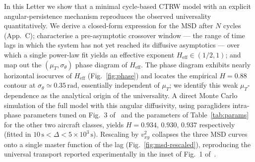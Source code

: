 \documentclass[11pt,a4paper]{article}
\begin{document}
In this Letter we show that a minimal cycle-based CTRW model with an
explicit angular-persistence mechanism reproduces the observed
universality quantitatively. We derive a closed-form expression for
the MSD after $N$ cycles (App.~C); characterise a pre-asymptotic
crossover window --- the range of time lags in which the system has
not yet reached its diffusive asymptotics --- over which a single
power-law fit yields an effective exponent $H_{\mathrm{eff}} \in
(1/2, 1)$; and map out the $(\mu_T,\sigma_\theta)$ phase diagram of
$H_{\mathrm{eff}}$. The phase diagram exhibits nearly horizontal
isocurves of $H_{\mathrm{eff}}$ (Fig.~\ref{fig:phase}) and locates
the empirical $H=0.88$ contour at $\sigma_\theta\simeq
0.35\,\mathrm{rad}$, essentially independent of $\mu_T$; we identify
this weak $\mu_T$-dependence as the analytical origin of the
universality. A direct Monte Carlo simulation of the full model with
this angular diffusivity, using paragliders intra-phase
parameters tuned on Fig.~3 of~\cite{vilpellet2026} and the
parameters of Table~\ref{tab:params} for the other two aircraft
classes, yields $H=0.934,\,0.930,\,0.937$ respectively
(fitted in $10\,\mathrm{s}<\Delta<5\times10^3\,\mathrm{s}$).
Rescaling by $v_{xy}^2$ collapses the three MSD curves onto a
single master function of the lag (Fig.~\ref{fig:msd-rescaled}),
reproducing the universal transport reported experimentally in
the inset of Fig.~1 of~\cite{vilpellet2026}.
\end{document}
